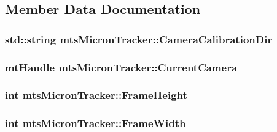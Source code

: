 \subsection{Member Data Documentation}
\hypertarget{classmts_micron_tracker_a1107867a28954dd0b2db6c2d42843438}{
\subsubsection[{Camera\-Calibration\-Dir}]{\setlength{\rightskip}{0pt plus 5cm}std\-::string mts\-Micron\-Tracker\-::\-Camera\-Calibration\-Dir\hspace{0.3cm}{\ttfamily [protected]}}}\label{classmts_micron_tracker_a1107867a28954dd0b2db6c2d42843438}
\hypertarget{classmts_micron_tracker_a51945d6df1036a1bd179ed1163cd3eff}{
\subsubsection[{Current\-Camera}]{\setlength{\rightskip}{0pt plus 5cm}mt\-Handle mts\-Micron\-Tracker\-::\-Current\-Camera\hspace{0.3cm}{\ttfamily [protected]}}}\label{classmts_micron_tracker_a51945d6df1036a1bd179ed1163cd3eff}
\hypertarget{classmts_micron_tracker_a5823ad8e94db01e18081a2649b085ffe}{
\subsubsection[{Frame\-Height}]{\setlength{\rightskip}{0pt plus 5cm}int mts\-Micron\-Tracker\-::\-Frame\-Height\hspace{0.3cm}{\ttfamily [protected]}}}\label{classmts_micron_tracker_a5823ad8e94db01e18081a2649b085ffe}
\hypertarget{classmts_micron_tracker_a5e43bc9b8bfb0ecfa61c31382e371bd0}{
\subsubsection[{Frame\-Width}]{\setlength{\rightskip}{0pt plus 5cm}int mts\-Micron\-Tracker\-::\-Frame\-Width\hspace{0.3cm}{\ttfamily [protected]}}}\label{classmts_micron_tracker_a5e43bc9b8bfb0ecfa61c31382e371bd0}
